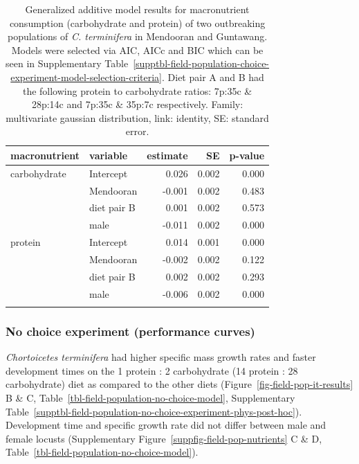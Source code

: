 \documentclass[
]{article}
\begin{document}
\begin{longtable}{llrrr}

\toprule
macronutrient & variable & estimate & SE & p-value \\ 
\midrule\addlinespace[2.5pt]
carbohydrate & Intercept & 0.026 & 0.002 & 0.000 \\ 
 & Mendooran & -0.001 & 0.002 & 0.483 \\ 
 & diet pair B & 0.001 & 0.002 & 0.573 \\ 
 & male & -0.011 & 0.002 & 0.000 \\ 
protein & Intercept & 0.014 & 0.001 & 0.000 \\ 
 & Mendooran & -0.002 & 0.002 & 0.122 \\ 
 & diet pair B & 0.002 & 0.002 & 0.293 \\ 
 & male & -0.006 & 0.002 & 0.000 \\ 
\bottomrule

\caption{\label{tbl-field-population-it-model}Generalized additive model
results for macronutrient consumption (carbohydrate and protein) of two
outbreaking populations of \emph{C. terminifera} in Mendooran and
Guntawang. Models were selected via AIC, AICc and BIC which can be seen
in
Supplementary Table~\ref{supptbl-field-population-choice-experiment-model-selection-criteria}.
Diet pair A and B had the following protein to carbohydrate ratios:
7p:35c \& 28p:14c and 7p:35c \& 35p:7c respectively. Family:
multivariate gaussian distribution, link: identity, SE: standard error.}

\tabularnewline

\end{longtable}

\endgroup

\subsubsection{No choice experiment (performance
curves)}\label{no-choice-experiment-performance-curves}

\emph{Chortoicetes terminifera} had higher specific mass growth rates
and faster development times on the 1 protein : 2 carbohydrate (14
protein : 28 carbohydrate) diet as compared to the other diets
(Figure~\ref{fig-field-pop-it-results} B \& C,
Table~\ref{tbl-field-population-no-choice-model},
Supplementary Table~\ref{supptbl-field-population-no-choice-experiment-phys-post-hoc}).
Development time and specific growth rate did not differ between male
and female locusts
(Supplementary Figure~\ref{suppfig-field-pop-nutrients} C \& D,
Table~\ref{tbl-field-population-no-choice-model}).
\end{document}
